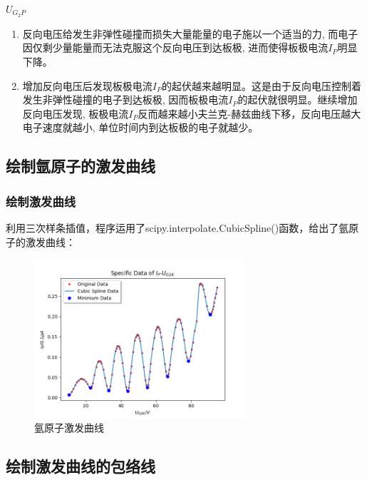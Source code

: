 \documentclass[a4paper,UTF8]{ctexart}
\begin{document}
{\uppercase\expandafter{} \bfseries $U_{G_{2}P}$} \cite{UF}

\begin{framed}
    \begin{enumerate}
        \item 反向电压给发生非弹性碰撞而损失大量能量的电子施以一个适当的力, 而电子因仅剩少量能量而无法克服这个反向电压到达板极, 进而使得板极电流$I_P$明显下降。
        \item 增加反向电压后发现板极电流$I_P$的起伏越来越明显。这是由于反向电压控制着发生非弹性碰撞的电子到达板极, 因而板极电流$I_P$的起伏就很明显。继续增加反向电压发现, 板极电流$I_P$反而越来越小夫兰克-赫兹曲线下移，反向电压越大电子速度就越小, 单位时间内到达板极的电子就越少。
    \end{enumerate}
\end{framed}

\subsection{绘制氩原子的激发曲线}

\subsubsection{绘制激发曲线}

利用三次样条插值，程序运用了scipy.interpolate.CubicSpline()函数，给出了氩原子的激发曲线：

\begin{figure}[H]
    \centering
    \begin{minipage}[b]{0.9\textwidth}
        \centering
        \includegraphics[width=0.7\textwidth]{./cs.png}
        \caption{氩原子激发曲线}
    \end{minipage}
\end{figure}

\subsection{绘制激发曲线的包络线}
\end{document}
